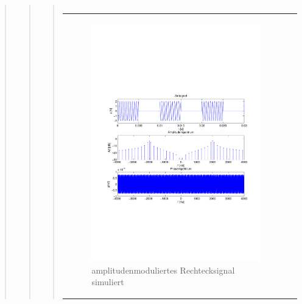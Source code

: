 \begin{quote}
\begin{quote}
\begin{quote}
\begin{center}
\begin{tabular}{ll}
                \end{tabular}
                \end{center}
                
                        \begin{center}
                \begin{tabular}{ll}
    
                \hspace{-10em}
                    \begin{minipage}{0.6\textwidth}
    
                        \begin{figure}[H]
                            \label{fig:}
                            \includegraphics[scale=0.4, trim = 2cm 6.5cm 1.5cm
                            8.5cm, clip]{./Bilder/Rechteckmodsimuliert} %
                            \caption{amplitudenmoduliertes Rechtecksignal simuliert}
                        \end{figure}
    

\end{minipage}
\end{tabular}
\end{center}
\end{quote}
\end{quote}
\end{quote}

